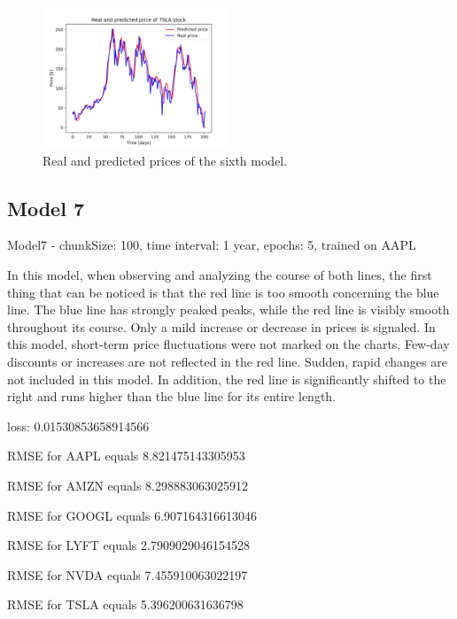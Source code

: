 \begin{figure}
\includegraphics[width=0.5\textwidth]{./graf/model6/TSLA.png}
\caption{Real and predicted prices of the sixth model.}
\label{fig:label}
\end{figure} 

\clearpage
\subsection{Model 7}

Model7 - chunkSize: 100, time interval: 1 year, epochs: 5, trained on AAPL\par\bigskip
In this model, when observing and analyzing the course of both lines, the first thing that can be
noticed is that the red line is too smooth concerning the blue line. The blue line has strongly
peaked peaks, while the red line is visibly smooth throughout its course. Only a mild increase or
decrease in prices is signaled. In this model, short-term price fluctuations were not marked on the
charts. Few-day discounts or increases are not reflected in the red line. Sudden, rapid
changes are not included in this model. In addition, the red line is significantly shifted to the right and
runs higher than the blue line for its entire length.
\par\bigskip
loss: 0.01530853658914566\par
RMSE for AAPL equals 8.821475143305953\par
RMSE for AMZN equals 8.298883063025912\par
RMSE for GOOGL equals 6.907164316613046\par
RMSE for LYFT equals 2.7909029046154528\par
RMSE for NVDA equals 7.455910063022197\par
RMSE for TSLA equals 5.396200631636798\par

